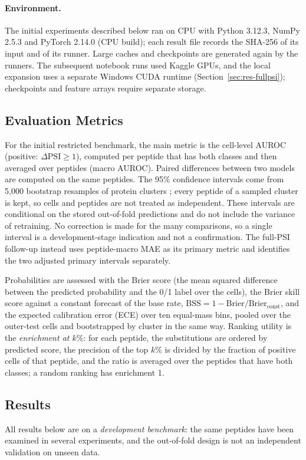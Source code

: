 \paragraph{Environment.}
The initial experiments described below ran on CPU with Python 3.12.3, NumPy 2.5.3 and PyTorch 2.14.0 (CPU build); each result file
records the SHA-256 of its input and of its runner. Large caches and checkpoints are generated again by the
runners. The subsequent notebook runs used Kaggle GPUs, and the local expansion uses a separate
Windows CUDA runtime (Section~\ref{sec:res-fullpsi}); checkpoints and feature arrays require separate storage.

\subsection{Evaluation Metrics}
For the initial restricted benchmark, the main metric is the cell-level AUROC (positive: $\Delta\mathrm{PSI}\ge1$), computed per peptide that has both
classes and then averaged over peptides (macro AUROC). Paired differences between two models are computed on
the same peptides. The 95\% confidence intervals come from 5,000 bootstrap resamples of protein clusters
\citep{efron1979}; every peptide of a sampled cluster is kept, so cells and peptides are not treated as
independent. These intervals are conditional on the stored out-of-fold predictions and do not include the
variance of retraining. No correction is made for the many comparisons, so a single interval is a
development-stage indication and not a confirmation. The full-PSI follow-up instead uses peptide-macro
MAE as its primary metric and identifies the two adjusted primary intervals separately.

Probabilities are assessed with the Brier score (the mean squared difference between the predicted
probability and the 0/1 label over the cells), the Brier skill score against a constant forecast of the base rate,
$\mathrm{BSS}=1-\mathrm{Brier}/\mathrm{Brier}_{\mathrm{const}}$, and the expected calibration error (ECE) over ten
equal-mass bins, pooled over the outer-test cells and bootstrapped by cluster in the same way. Ranking utility is the
\emph{enrichment at $k\%$}: for each peptide, the substitutions are ordered by predicted score, the precision of the
top $k\%$ is divided by the fraction of positive cells of that peptide, and the ratio is averaged over the peptides
that have both classes; a random ranking has enrichment 1.

\subsection{Results}\label{sec:results}
All results below are on a \emph{development benchmark}: the same \nNPep{} peptides have been examined in
several experiments, and the out-of-fold design is not an independent validation on unseen data.

